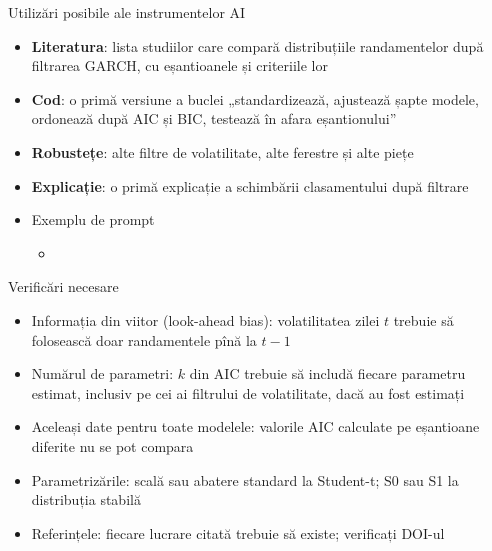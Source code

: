 \begin{frame}{Utilizări posibile ale instrumentelor AI}
\itemsize{\small}
\begin{itemize}
    \item \textbf{Literatura}: lista studiilor care compară distribuțiile randamentelor după filtrarea GARCH, cu eșantioanele și criteriile lor
    \item \textbf{Cod}: o primă versiune a buclei „standardizează, ajustează șapte modele, ordonează după AIC și BIC, testează în afara eșantionului”
    \item \textbf{Robustețe}: alte filtre de volatilitate, alte ferestre și alte piețe
    \item \textbf{Explicație}: o primă explicație a schimbării clasamentului după filtrare
    \item Exemplu de prompt
    \begin{itemize}
        \item {}
    \end{itemize}
\end{itemize}
\end{frame}

\begin{frame}{Verificări necesare}
\itemsize{\small}
\begin{itemize}
    \item Informația din viitor (look-ahead bias): volatilitatea zilei $t$ trebuie să folosească doar randamentele pînă la $t - 1$
    \item Numărul de parametri: $k$ din AIC trebuie să includă fiecare parametru estimat, inclusiv pe cei ai filtrului de volatilitate, dacă au fost estimați
    \item Aceleași date pentru toate modelele: valorile AIC calculate pe eșantioane diferite nu se pot compara
    \item Parametrizările: scală sau abatere standard la Student-t; S0 sau S1 la distribuția stabilă
    \item Referințele: fiecare lucrare citată trebuie să existe; verificați DOI-ul
\end{itemize}
\end{frame}


